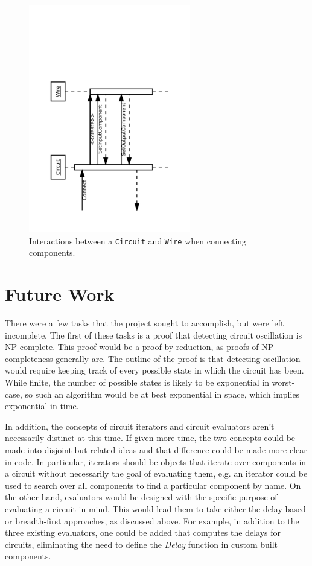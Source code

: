 \documentclass{article}
\newcommand{\ClassName}[1]{\texttt{#1}}
\newcommand{\FunctionName}[1]{\textit{#1}}
\begin{document}
\begin{figure}[H]
    \begin{center}
        \includegraphics[angle=270,width=200pt]{imgs/ComponentConnectionInteraction.pdf}
    \end{center}
    \caption{Interactions between a \ClassName{Circuit} and \ClassName{Wire} when connecting components.}
\end{figure}

\section{Future Work}

There were a few tasks that the project sought to accomplish, but were left incomplete. The first of these tasks is a proof that detecting circuit oscillation is NP-complete. This proof would be a proof by reduction, as proofs of NP-completeness generally are. The outline of the proof is that detecting oscillation would require keeping track of every possible state in which the circuit has been. While finite, the number of possible states is likely to be exponential in worst-case, so such an algorithm would be at best exponential in space, which implies exponential in time.

In addition, the concepts of circuit iterators and circuit evaluators aren’t necessarily distinct at this time. If given more time, the two concepts could be made into disjoint but related ideas and that difference could be made more clear in code. In particular, iterators should be objects that iterate over components in a circuit without necessarily the goal of evaluating them, e.g. an iterator could be used to search over all components to find a particular component by name. On the other hand, evaluators would be designed with the specific purpose of evaluating a circuit in mind. This would lead them to take either the delay-based or breadth-first approaches, as discussed above. For example, in addition to the three existing evaluators, one could be added that computes the delays for circuits, eliminating the need to define the \FunctionName{Delay} function in custom built components.
\end{document}
